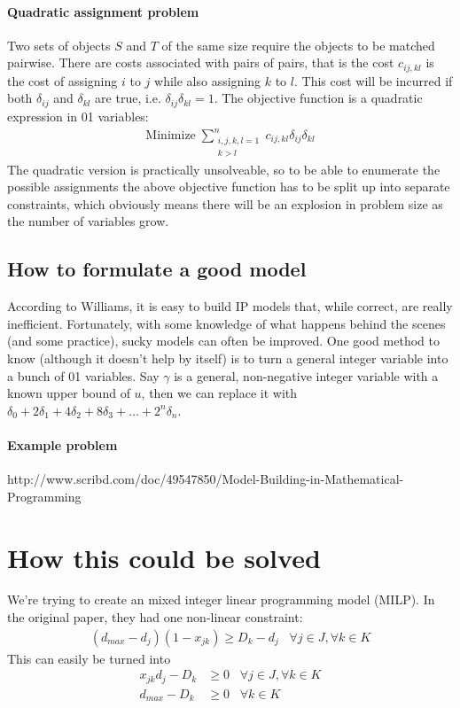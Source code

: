 \documentclass[12pt, landscape]{article}
\def\monofont{\fontspec[Script=Latin,Mapping=tex-text,Scale=0.91]{Inconsolata}}
\renewcommand{\texttt}[1]{{\monofont #1}}
\begin{document}
\paragraph*{Quadratic assignment problem} Two sets of objects $S$ and $T$ of the same size require the objects to be matched pairwise. There are costs associated with pairs of pairs, that is the cost $c_{ij,kl}$ is the cost of assigning $i$ to $j$ while also assigning $k$ to $l$. This cost will be incurred if both $\delta_{ij}$ and $\delta_{kl}$ are \texttt{true}, i.e. $\delta_{ij}\delta_{kl} = 1$. The objective function is a quadratic expression in 01 variables:
\begin{align}
\mathrm{Minimize}\;\sum^n_{\substack{i,j,k,l=1\\k>l}} c_{ij,kl}\delta_{ij}\delta_{kl}
\end{align}
The quadratic version is practically unsolveable, so to be able to enumerate the possible assignments the above objective function has to be split up into separate constraints, which obviously means there will be an explosion in problem size as the number of variables grow.

\subsection{How to formulate a good model}
According to Williams, it is easy to build IP models that, while correct, are really inefficient. Fortunately, with some knowledge of what happens behind the scenes (and some practice), sucky models can often be improved. One good method to know (although it doesn't help by itself) is to turn a general integer variable into a bunch of 01 variables. Say $\gamma$ is a general, non-negative integer variable with a known upper bound of $u$, then we can replace it with $\delta_0 + 2\delta_1 + 4\delta_2 + 8\delta_3 + \dots + 2^n\delta_n$. 

\paragraph*{Example problem} 
http://www.scribd.com/doc/49547850/Model-Building-in-Mathematical-Programming

\pagebreak
\section{How this could be solved}
We're trying to create an mixed integer linear programming model (MILP). In the original paper, they had one non-linear constraint:
\begin{align}
  (d_{max}-d_j)(1-x_{jk}) \geq D_k-d_j \;\;\;\forall j \in J, \forall k \in K
\end{align}
This can easily be turned into
\begin{align}
  x_{jk}d_j-D_k &\geq 0\;\;\;\forall j \in J, \forall k \in K\\
  d_{max}-D_k &\geq 0\;\;\;\forall k \in K
\end{align}
\end{document}
